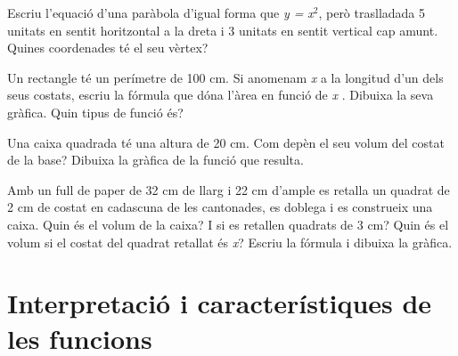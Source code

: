 \begin{mylist}
	
	\exer  Escriu l'equació d'una paràbola d'igual forma que \textit{y =} \textit{x}${}^{2}$, però traslladada 5 unitats en sentit horitzontal a la dreta i 3 unitats en sentit vertical cap amunt. Quines coordenades té el seu vèrtex?
	
	
	\exer  Un rectangle té un perímetre de 100 cm. Si anomenam \textit{x} a la longitud d'un dels seus costats, escriu la fórmula que dóna l'àrea en funció de \textit{x} . Dibuixa la seva gràfica. Quin tipus de funció és?
	
	
	\exer  Una caixa quadrada té una altura de 20 cm. Com depèn el seu volum del costat de la base? Dibuixa la gràfica de la funció que resulta.
	
	
	\exer  Amb un full de paper de 32 cm de llarg i 22 cm d'ample es retalla un quadrat de 2 cm de costat en cadascuna de les cantonades, es doblega i es construeix una caixa. Quin és el volum de la caixa? I si es retallen quadrats de 3 cm? Quin és el volum si el costat del quadrat retallat és\textit{ x}? Escriu la fórmula i dibuixa la gràfica.






\end{mylist}
 


\section{Interpretació i característiques de les funcions}


